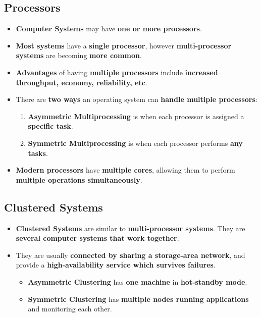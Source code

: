 \documentclass[16pt]{article}
\begin{document}
    \subsection*{Processors}
    \begin{itemize}
        \item \textbf{Computer Systems} may have \textbf{one or more processors}.
        \item \textbf{Most systems} have a \textbf{single processor}, however \textbf{multi-processor systems} are becoming \textbf{more common}.
        \item \textbf{Advantages} of having \textbf{multiple processors} include \textbf{increased throughput, economy, reliability, etc}.
        \item There are \textbf{two ways} an operating system can \textbf{handle multiple processors}:
        \begin{enumerate}
            \item \textbf{Asymmetric Multiprocessing} is when each processor is assigned a \textbf{specific task}.
            \item \textbf{Symmetric Multiprocessing} is when each processor performs \textbf{any tasks}.
        \end{enumerate}
        \item \textbf{Modern processors} have \textbf{multiple cores}, allowing them to perform \textbf{multiple operations simultaneously}.
    \end{itemize}

    \subsection*{Clustered Systems}
    \begin{itemize}
        \item \textbf{Clustered Systems} are similar to \textbf{multi-processor systems}. They are \textbf{several computer systems that work together}.
        \item They are usually \textbf{connected by sharing a storage-area network}, and provide a \textbf{high-availability service which survives failures}.
        \begin{itemize}
            \item \textbf{Asymmetric Clustering} has \textbf{one machine} in \textbf{hot-standby mode}.
            \item \textbf{Symmetric Clustering} has \textbf{multiple nodes running applications} and monitoring each other.
        \end{itemize}
    \end{itemize}
\end{document}
